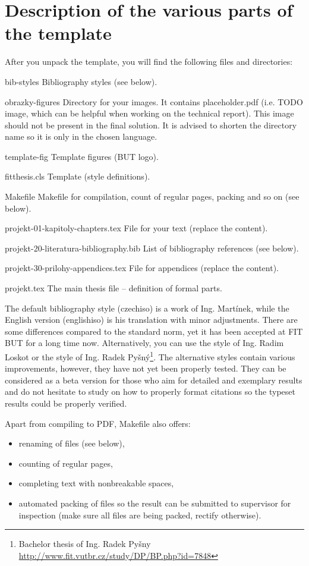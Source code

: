 \section*{Description of the various parts of the template}

After you unpack the template, you will find the following files and directories:
\begin{DESCRIPTION}
  \item [bib-styles] Bibliography styles (see below). 
  \item [obrazky-figures] Directory for your images. It contains placeholder.pdf (i.e. TODO image, which can be helpful when working on the technical report). This image should not be present in the final solution. It is advised to shorten the directory name so it is only in the chosen language.
  \item [template-fig] Template figures (BUT logo).
  \item [fitthesis.cls] Template (style definitions).
  \item [Makefile] Makefile for compilation, count of regular pages, packing and so on (see below).
  \item [projekt-01-kapitoly-chapters.tex] File for your text (replace the content).
  \item [projekt-20-literatura-bibliography.bib] List of bibliography references (see below).
  \item [projekt-30-prilohy-appendices.tex] File for appendices (replace the content).
  \item [projekt.tex] The main thesis file -- definition of formal parts.
\end{DESCRIPTION}

The default bibliography style (czechiso) is a work of Ing. Martínek, while the English version (englishiso) is his translation with minor adjustments. There are some differences compared to the standard norm, yet it has been accepted at FIT BUT for a long time now. Alternatively, you can use the style of Ing. Radim Loskot or the style of Ing. Radek Pyšný\footnote{Bachelor thesis of Ing. Radek Pyšny \url{http://www.fit.vutbr.cz/study/DP/BP.php?id=7848}}. The alternative styles contain various improvements, however, they have not yet been properly tested. They can be considered as a beta version for those who aim for detailed and exemplary results and do not hesitate to study on how to properly format citations so the typeset results could be properly verified.

Apart from compiling to PDF, Makefile also offers:
\begin{itemize}
  \item renaming of files (see below),
  \item counting of regular pages,
  \item completing text with nonbreakable spaces,
  \item automated packing of files so the result can be submitted to supervisor for inspection (make sure all files are being packed, rectify otherwise).
\end{itemize}


